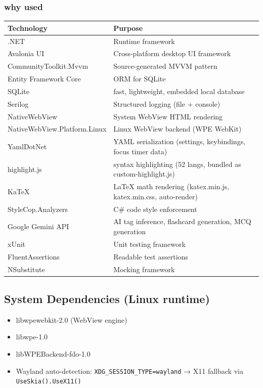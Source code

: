 \documentclass[14pt]{article}
\begin{document}
\subsubsection{why used}
\label{sec:org8c42b09}
\begin{center}
\begin{tabular}{ll}
Technology & Purpose\\
\hline
.NET & Runtime framework\\
Avalonia UI & Cross-platform desktop UI framework\\
CommunityToolkit.Mvvm & Source-generated MVVM pattern\\
Entity Framework Core & ORM for SQLite\\
SQLite & fast, lightweight, embedded local database\\
Serilog & Structured logging (file + console)\\
NativeWebView & System WebView HTML rendering\\
NativeWebView.Platform.Linux & Linux WebView backend (WPE WebKit)\\
YamlDotNet & YAML serialization (settings, keybindings, focus timer data)\\
highlight.js & syntax highlighting (52 langs, bundled as custom-highlight.js)\\
KaTeX & \LaTeX{} math rendering (katex.min.js, katex.min.css, auto-render)\\
StyleCop.Analyzers & C\# code style enforcement\\
Google Gemini API & AI tag inference, flashcard generation, MCQ generation\\
xUnit & Unit testing framework\\
FluentAssertions & Readable test assertions\\
NSubstitute & Mocking framework\\
\end{tabular}
\end{center}
\subsection{System Dependencies (Linux runtime)}
\label{sec:orgff035e1}
\begin{itemize}
\item libwpewebkit-2.0 (WebView engine)
\item libwpe-1.0
\item libWPEBackend-fdo-1.0
\item Wayland auto-detection: \texttt{XDG\_SESSION\_TYPE=wayland} → X11 fallback
via \texttt{UseSkia().UseX11()}
\end{itemize}
\end{document}
